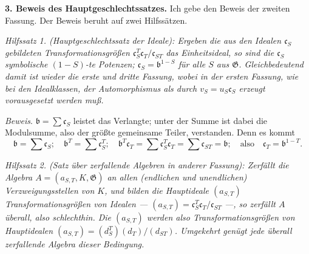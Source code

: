 \noindent\textbf{3. Beweis des Hauptgeschlechtssatzes.} Ich gebe den Beweis der zweiten Fassung. Der Beweis beruht auf zwei Hilfssätzen.

\emph{Hilfssatz 1. (Hauptgeschlechtssatz der Ideale): Ergeben die aus den Idealen \(\mathfrak c_S\) gebildeten Transformationsgrößen \(\mathfrak c_S^T\mathfrak c_T/\mathfrak c_{ST}\) das Einheitsideal, so sind die \(\mathfrak c_S\) symbolische \((1-S)\)-te Potenzen; \(\mathfrak c_S=\mathfrak b^{1-S}\) für alle \(S\) aus \(\mathfrak G\). Gleichbedeutend damit ist wieder die erste und dritte Fassung, wobei in der ersten Fassung, wie bei den Idealklassen, der Automorphismus als durch \(v_S=u_S\mathfrak c_S\) erzeugt vorausgesetzt werden muß.}

\emph{Beweis}. \(\mathfrak b=\sum\mathfrak c_S\) leistet das Verlangte; unter der Summe ist dabei die Modulsumme, also der größte gemeinsame Teiler, verstanden. Denn es kommt
\[
\mathfrak b=\sum\mathfrak c_S;\quad
\mathfrak b^T=\sum\mathfrak c_S^T;\quad
\mathfrak b^T\mathfrak c_T=\sum\mathfrak c_S^T\mathfrak c_T
=\sum\mathfrak c_{ST}=\mathfrak b;\quad
\text{also}\quad\mathfrak c_T=\mathfrak b^{1-T}.
\]

\emph{Hilfssatz 2. (Satz über zerfallende Algebren in anderer Fassung): Zerfällt die Algebra \(A=(a_{S,T},K,\mathfrak G)\) an allen (endlichen und unendlichen) Verzweigungsstellen von \(K\), und bilden die Hauptideale \((a_{S,T})\) Transformationsgrößen von Idealen --- \((a_{S,T})=\mathfrak c_S^T\mathfrak c_T/\mathfrak c_{ST}\) ---, so zerfällt \(A\) überall, also schlechthin. Die \((a_{S,T})\) werden also Transformationsgrößen von Hauptidealen \((a_{S,T})=(d_S^T)(d_T)/(d_{ST})\). Umgekehrt genügt jede überall zerfallende Algebra dieser Bedingung.}

